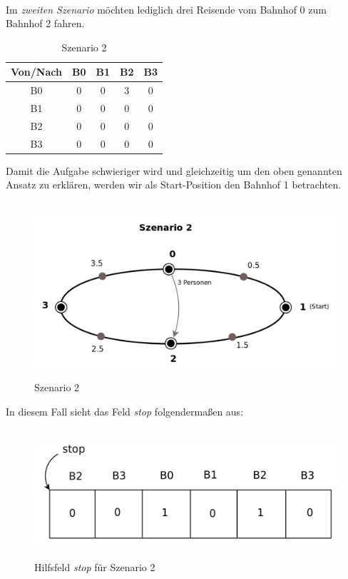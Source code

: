 \\
Im \textit{zweiten Szenario} möchten lediglich drei Reisende vom Bahnhof 0 zum Bahnhof 2 fahren.\\
\begin{table}[H]
\caption{Szenario 2}
\center
 \begin{tabular}{|c|c|c|c|c|}
 \hline
  Von/Nach & B0 & B1 & B2 & B3 \\ \hline
  B0 & 0 & 0 & 3 & 0\\   \hline
    B1 & 0 & 0 & 0 & 0 \\   \hline
      B2 & 0 & 0 & 0 & 0\\   \hline
        B3 & 0 & 0 & 0 & 0 \\   \hline
 \end{tabular}
\end{table}
\noindent
Damit die Aufgabe schwieriger wird und gleichzeitig um den oben genannten Ansatz zu erklären, werden wir als Start-Position den Bahnhof 1 betrachten.\\
\\
\begin{figure}[H]	
\caption{Szenario 2}
\includegraphics[width=2\textwidth, width=450pt]{content/images/szenario2.png}
\label{pic:szenario2}
\end{figure}
\noindent
In diesem Fall sieht das Feld \textit{stop} folgendermaßen aus:\\
\\
\begin{figure}[H]	
\caption{Hilfsfeld \textit{stop} für Szenario 2}
\includegraphics[width=2\textwidth, width=290pt]{content/images/stop2.png}
\label{pic:stop2}
\end{figure}
